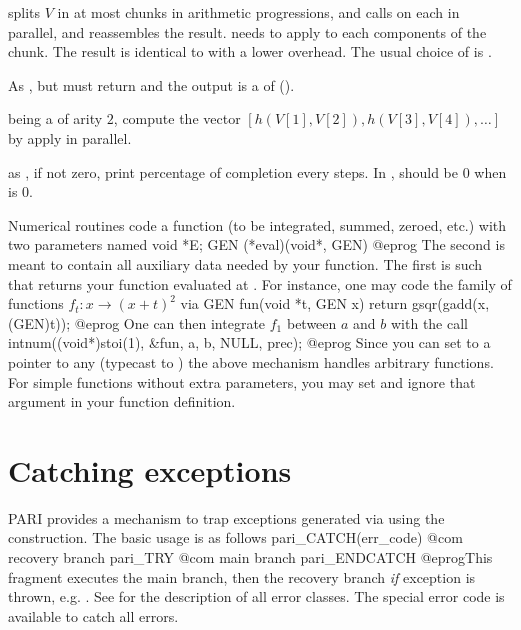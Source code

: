 splits $V$ in at most  chunks in arithmetic progressions,
and calls  on each in parallel, and reassembles the result.
 needs to apply  to each components of the chunk.
The result is identical to  with a lower overhead.
The usual choice of  is .

As , but  must return  and the
output is a  of  ().

 being a  of arity $2$, compute the vector
$[h(V[1],V[2]), h(V[3],V[4]), \ldots]$
by apply  in parallel.

 as , if  not zero, print percentage of
completion every  steps.  In ,  should
be $0$ when  is $0$.


Numerical routines code a function (to be integrated, summed, zeroed, etc.)
with two parameters named
\bprog
  void *E;
  GEN (*eval)(void*, GEN)
@eprog\noindent
The second is meant to contain all auxiliary data needed by your function.
The first is such that  returns your function evaluated at
. For instance, one may code the family of functions
$f_t: x \to (x+t)^2$ via
\bprog
GEN fun(void *t, GEN x) { return gsqr(gadd(x, (GEN)t)); }
@eprog\noindent
One can then integrate $f_1$ between $a$ and $b$ with the call
\bprog
intnum((void*)stoi(1), &fun, a, b, NULL, prec);
@eprog\noindent
Since you can set  to a pointer to any  (typecast to
) the above mechanism handles arbitrary functions. For simple
functions without extra parameters, you may set  and ignore
that argument in your function definition.

\section{Catching exceptions}


PARI provides a mechanism to trap exceptions generated via 
using the  construction. The basic usage is as follows
\bprog
 pari_CATCH(err_code) {
   @com recovery branch
 }
 pari_TRY {
   @com main branch
 }
 pari_ENDCATCH
@eprog\noindent This fragment executes the main branch, then the recovery
branch \emph{if} exception  is thrown, e.g. .
See  for the description of all error classes.
The special error code  is available to catch all errors.

